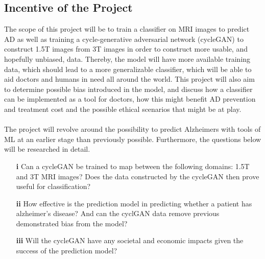 \documentclass[12pt, fleqn, titlepage]{article}
\begin{document}
\subsection{Incentive of the Project}
The scope of this project will be to train a classifier on MRI images to predict AD as well as training a cycle-generative adversarial network (cycleGAN)
to construct 1.5T images from 3T images in order to construct more usable, and
hopefully unbiased, data. Thereby, the model will have more available training
data, which should lead to a more generalizable classifier, which will be able to aid doctors and humans in need all around the world. This project will also aim to determine possible bias introduced in the model, and discuss how a classifier can be implemented as a tool for doctors, how this might benefit AD prevention and
treatment cost and the possible ethical scenarios that might be at play.
\\\\
The project will revolve around the possibility to predict Alzheimers with tools of ML at an
earlier stage than previously possible. Furthermore, the questions below will be researched in detail.

\begin{itemize}
	\item[\textbf{i}] Can a cycleGAN be trained to map between the following domains: 1.5T and 3T MRI
	images? Does the data constructed by the cycleGAN then prove useful for classification?
	
	\item[\textbf{ii}] How effective is the prediction model in predicting whether a patient has
	alzheimer’s disease? And can the cyclGAN data remove previous demonstrated bias from the model?
	
	\item[\textbf{iii}] Will the cycleGAN have any societal and economic impacts
	given the success of the prediction model?
	
\end{itemize}
\end{document}
